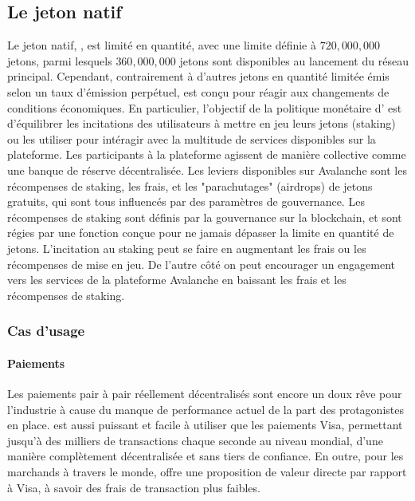 \documentclass[runningheads]{llncs}
\begin{document}
\subsection{Le jeton natif \AVATokenName{}}
Le jeton natif, \AVATokenName{}, est limité en quantité, avec une limite définie à $720,000,000$ jetons, parmi lesquels
$360,000,000$ jetons sont disponibles au lancement du réseau principal. Cependant, contrairement à d'autres jetons en
quantité limitée émis selon un taux d'émission perpétuel, \AVATokenName{} est conçu pour réagir aux changements de
conditions économiques. En particulier, l'objectif de la politique monétaire d'\AVATokenName{} est d'équilibrer les
incitations des utilisateurs à mettre en jeu leurs jetons (staking) ou les utiliser pour intéragir avec la multitude de
services disponibles sur la plateforme. Les participants à la plateforme agissent de manière collective comme une banque
de réserve décentralisée. Les leviers disponibles sur Avalanche sont les récompenses de staking, les frais, et les
"parachutages" (airdrops) de jetons gratuits, qui sont tous influencés par des paramètres de gouvernance. Les
récompenses de staking sont définis par la gouvernance sur la blockchain, et sont régies par une fonction conçue pour
ne jamais dépasser la limite en quantité de jetons. L'incitation au staking peut se faire en augmentant les frais ou les
récompenses de mise en jeu. De l'autre côté on peut encourager un engagement vers les services de la plateforme
Avalanche en baissant les frais et les récompenses de staking.

\subsubsection{Cas d'usage}
\paragraph{Paiements}
Les paiements pair à pair réellement décentralisés sont encore un doux rêve pour l'industrie à cause du manque de
performance actuel de la part des protagonistes en place. \AVATokenName{} est aussi puissant et facile à utiliser que
les paiements Visa, permettant jusqu'à des milliers de transactions chaque seconde au niveau mondial, d'une manière
complètement décentralisée et sans tiers de confiance. En outre, pour les marchands à travers le monde, \AVATokenName{}
offre une proposition de valeur directe par rapport à Visa, à savoir des frais de transaction plus faibles.
\end{document}
